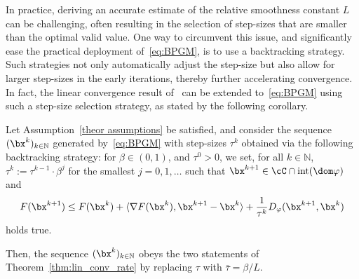 \documentclass[11pt]{amsart}
\begin{document}
In practice, deriving an accurate estimate of the relative smoothness constant $L$ can be challenging, often resulting in the selection of step-sizes that are smaller than the optimal valid value. One way to circumvent this issue,  and significantly ease the practical deployment of~\cref{eq:BPGM}, is to use a backtracking strategy. Such strategies not only automatically adjust the step-size but also allow for larger step-sizes in the early iterations, thereby further accelerating convergence. In fact, the linear convergence result of~ can be extended to~\eqref{eq:BPGM} using such a step-size selection strategy, as stated by the following corollary. 

\begin{corollary}\label{coro:lin_cv_backtrack}
    Let Assumption~\ref{theor assumptions} be satisfied, and consider the sequence $(\bx^k)_{k \in \mathbb{N}}$ generated by~\cref{eq:BPGM} with step-sizes $\tau^k$ obtained via the following backtracking strategy: for $\beta \in (0,1)$, and $\tau^0 > 0$, we set, for all $k\in\mathbb{N}$, $\tau^k := \tau^{k-1} \cdot \beta^j$ for the smallest $j=0,1,\ldots$ such that $\bx^{k+1} \in \cC\cap \mathrm{int}(\dom \varphi)$ and 
    \begin{equation}\label{eq:backtrack_cond}
        F(\bx^{k+1}) \leq F(\bx^k) + \langle \nabla F(\bx^k), \bx^{k+1} - \bx^k\rangle + \frac{1}{\tau^k}D_\varphi (\bx^{k+1},\bx^k) 
    \end{equation}
    holds true.
    
    Then, the sequence $(\bx^k)_{k \in \mathbb{N}}$ obeys the two statements of Theorem~\ref{thm:lin_conv_rate} by replacing $\tau$ with $\bar{\tau} = \beta / L$. 
\end{corollary}
\end{document}
